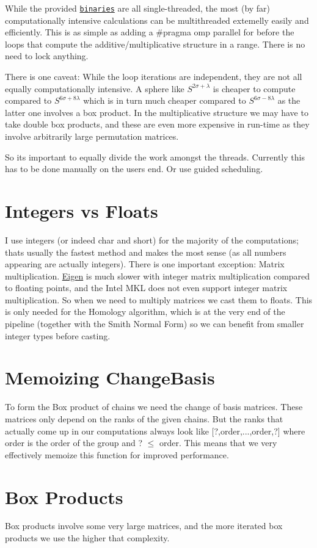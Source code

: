 \begin{DoxyItemize}
\item While the provided \href{https://github.com/NickG-Math/Mackey/tree/master/bin}{\tt binaries} are all single-\/threaded, the most (by far) computationally intensive calculations can be multithreaded extemelly easily and efficiently. This is as simple as adding a {\ttfamily \#pragma omp parallel for} before the loops that compute the additive/multiplicative structure in a range. There is no need to lock anything.
\item There is one caveat\+: While the loop iterations are independent, they are not all equally computationally intensive. A sphere like $S^{2\sigma+\lambda}$ is cheaper to compute compared to $S^{6\sigma+8\lambda}$ which is in turn much cheaper compared to $S^{6\sigma-8\lambda}$ as the latter one involves a box product. In the multiplicative structure we may have to take double box products, and these are even more expensive in run-\/time as they involve arbitrarily large permutation matrices.
\item So it\textquotesingle{}s important to equally divide the work amongst the threads. Currently this has to be done manually on the user\textquotesingle{}s end. Or use guided scheduling.
\end{DoxyItemize}\hypertarget{perf_intvsfloat}{}\section{Integers vs Floats}\label{perf_intvsfloat}
I use integers (or indeed {\ttfamily char} and {\ttfamily short}) for the majority of the computations; that\textquotesingle{}s usually the fastest method and makes the most sense (as all numbers appearing are actually integers). There is one important exception\+: Matrix multiplication. \hyperlink{namespaceEigen}{Eigen} is much slower with integer matrix multiplication compared to floating points, and the Intel M\+KL does not even support integer matrix multiplication. So when we need to multiply matrices we cast them to floats. This is only needed for the Homology algorithm, which is at the very end of the pipeline (together with the Smith Normal Form) so we can benefit from smaller integer types before casting.\hypertarget{perf_memo}{}\section{Memoizing Change\+Basis}\label{perf_memo}
To form the Box product of chains we need the change of basis matrices. These matrices only depend on the ranks of the given chains. But the ranks that actually come up in our computations always look like \mbox{[}?,order,...,order,?\mbox{]} where order is the order of the group and ? $\le$ order. This means that we very effectively memoize this function for improved performance.\hypertarget{perf_boxproducts}{}\section{Box Products}\label{perf_boxproducts}
Box products involve some very large matrices, and the more iterated box products we use the higher that complexity.


